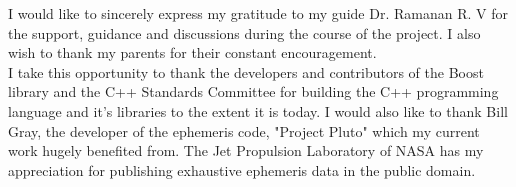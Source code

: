 
\begin{acknowledgements}      


I would like to sincerely express my gratitude to my guide Dr. Ramanan R. V for the support, guidance and discussions during the course of the project. I also wish to thank my parents for their constant encouragement.\\
I take this opportunity to thank the developers and contributors of the Boost library and the C++ Standards Committee for building the C++ programming language and it's libraries to the extent it is today. I would also like to thank Bill Gray, the developer of the ephemeris code, "Project Pluto" which my current work hugely benefited from. The Jet Propulsion Laboratory of NASA has my appreciation for publishing exhaustive ephemeris data in the public domain.

\end{acknowledgements}
